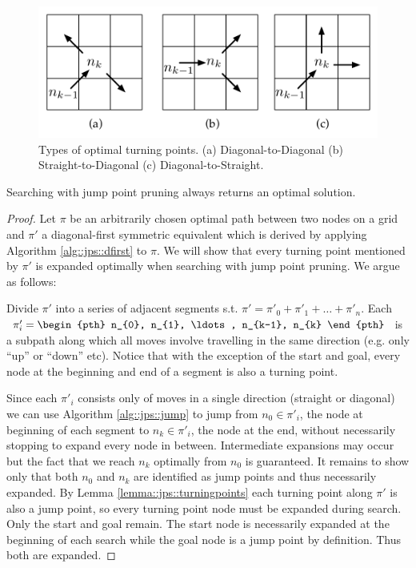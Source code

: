 \begin{figure}[tb]
       \begin{center}
		   \includegraphics[width=0.70\columnwidth, trim = 10mm 10mm 10mm 0mm]
			{chapter_jps/diagrams/turningpoints.pdf}
       \end{center}
	\vspace{-3pt}
       \caption{Types of optimal turning points. (a) Diagonal-to-Diagonal
(b) Straight-to-Diagonal (c) Diagonal-to-Straight.}
       \label{fig::jps::turningpoints}
\end{figure}

\begin{theorem}
\label{theorem::jps::jumping}
Searching with jump point pruning always returns an optimal solution. 
\end{theorem}
\begin{proof}
Let $\pi$ be an arbitrarily chosen optimal path between two nodes
on a grid and $\pi'$ a diagonal-first symmetric equivalent which is derived
by applying Algorithm \ref{alg::jps::dfirst} to $\pi$.
We will show that every turning point mentioned by $\pi'$ is expanded optimally 
when searching with jump point pruning. We argue as follows:
\par
Divide $\pi'$ into a series of adjacent segments s.t. 
$\pi' = \pi'_{0} + \pi'_{1} + \ldots + \pi'_{n} $. Each $\pi'_{i} = \begin{pth} n_{0}, n_{1},
\ldots, n_{k-1}, n_{k} \end{pth}$ is a subpath along which all moves involve
travelling in the same direction (e.g.  only ``up'' or ``down'' etc).  Notice
that with the exception of the start and goal, every node at the beginning and
end of a segment is also a turning point.
\par
Since each $\pi'_{i}$ consists only of moves in a single direction
(straight or diagonal) we can use Algorithm \ref{alg::jps::jump} to jump from $n_{0}
\in \pi'_{i}$, the node at beginning of each segment to $n_{k} \in \pi'_{i}$, the
node at the end, without necessarily stopping to expand every node in between.
Intermediate expansions may occur but the fact that we reach $n_{k}$
optimally from $n_{0}$ is guaranteed.
It remains to show only that both $n_{0}$ and $n_{k}$ are identified as
jump points and thus necessarily expanded. 
By Lemma \ref{lemma::jps::turningpoints} each turning point along $\pi'$ is 
also a jump point, so every turning point node must be expanded during search.
Only the start and goal remain. The start node is necessarily expanded at the
beginning of each search while the goal node is a jump point by definition.
Thus both are expanded.
\end{proof}

